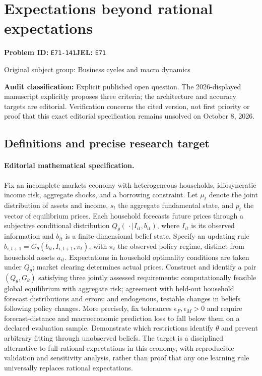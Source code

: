 \documentclass[11pt,a4paper]{article}
\begin{document}
\section*{Expectations beyond rational expectations}
\textbf{Problem ID:} \texttt{E71-141}\quad \textbf{JEL:} \texttt{E71}\par
\label{problem:OP-0233}
\label{audited:ECON-027}
{\sffamily\small\color{muted}Original subject group: Business cycles and macro dynamics\par}
\label{definitions:problem:30007514}
\textbf{Audit classification:} Explicit published open question. The 2026-displayed manuscript explicitly proposes three criteria; the architecture and accuracy targets are editorial. Verification concerns the cited version, not first priority or proof that this exact editorial specification remains unsolved on October 8, 2026.
\subsection*{Definitions and precise research target}
\paragraph{Editorial mathematical specification.} Fix an incomplete-markets economy with heterogeneous households, idiosyncratic income risk, aggregate shocks, and a borrowing constraint. Let \(\mu_t\) denote the joint distribution of assets and income, \(s_t\) the aggregate fundamental state, and \(p_t\) the vector of equilibrium prices. Each household forecasts future prices through a subjective conditional distribution \(Q_\theta(\,\cdot\mid I_{it},b_{it})\), where \(I_{it}\) is its observed information and \(b_{it}\) is a finite-dimensional belief state. Specify an updating rule \(b_{i,t+1}=G_\theta(b_{it},I_{i,t+1},\pi_t)\), with \(\pi_t\) the observed policy regime, distinct from household assets \(a_{it}\). Expectations in household optimality conditions are taken under \(Q_\theta\); market clearing determines actual prices.
Construct and identify a pair \((Q_\theta,G_\theta)\) satisfying three jointly assessed requirements: computationally feasible global equilibrium with aggregate risk; agreement with held-out household forecast distributions and errors; and endogenous, testable changes in beliefs following policy changes. More precisely, fix tolerances \(\epsilon_F,\epsilon_M>0\) and require forecast-distance and macroeconomic prediction loss to fall below them on a declared evaluation sample. Demonstrate which restrictions identify \(\theta\) and prevent arbitrary fitting through unobserved beliefs. The target is a disciplined alternative to full rational expectations in this economy, with reproducible validation and sensitivity analysis, rather than proof that any one learning rule universally replaces rational expectations.
\end{document}
